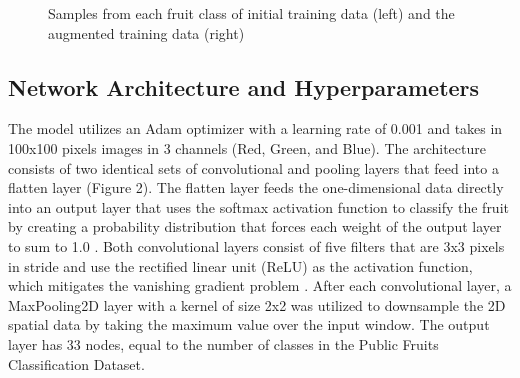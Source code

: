 \documentclass[11pt]{article}
\begin{document}
\begin{figure}[h]%
    \centering
    \qquad
    \caption{\centering Samples from each fruit class of initial training data (left) and the augmented training data (right)}%
    \label{fig:example}%
\end{figure}

\subsection{Network Architecture and Hyperparameters}
The model utilizes an Adam optimizer with a learning rate of 0.001 and takes in 100x100 pixels images in 3 channels (Red, Green, and Blue). The architecture consists of two identical sets of convolutional and pooling layers that feed into a flatten layer (Figure 2). The flatten layer feeds the one-dimensional data directly into an output layer that uses the softmax activation function to classify the fruit by creating a probability distribution that forces each weight of the output layer to sum to 1.0 \cite{mitchell2024cs63}. Both convolutional layers consist of five filters that are 3x3 pixels in stride and use the rectified linear unit (ReLU) as the activation function, which mitigates the vanishing gradient problem \cite{mitchell2024cs63}. After each convolutional layer, a MaxPooling2D layer with a kernel of size 2x2 was utilized to downsample the 2D spatial data by taking the maximum value over the input window. The output layer has 33 nodes, equal to the number of classes in the Public Fruits Classification Dataset. 
\end{document}
